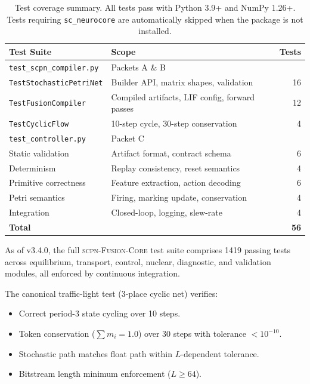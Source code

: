 \documentclass[12pt]{article}
\newcommand{\code}[1]{\texttt{#1}}
\newcommand{\scpn}{\textsc{scpn-Fusion-Core}}
\begin{document}
\begin{table}[htbp]
\centering
\caption{Test coverage summary.  All tests pass with Python 3.9+ and
NumPy 1.26+.  Tests requiring \code{sc\_neurocore} are automatically
skipped when the package is not installed.}
\label{tab:test-coverage}
\begin{tabular}{llr}
\toprule
Test Suite & Scope & Tests \\
\midrule
\code{test\_scpn\_compiler.py} & Packets A \& B &  \\
\quad \code{TestStochasticPetriNet} & Builder API, matrix shapes, validation & 16 \\
\quad \code{TestFusionCompiler} & Compiled artifacts, LIF config, forward passes & 12 \\
\quad \code{TestCyclicFlow} & 10-step cycle, 30-step conservation & 4 \\
\midrule
\code{test\_controller.py} & Packet C &  \\
\quad Static validation & Artifact format, contract schema & 6 \\
\quad Determinism & Replay consistency, reset semantics & 4 \\
\quad Primitive correctness & Feature extraction, action decoding & 6 \\
\quad Petri semantics & Firing, marking update, conservation & 4 \\
\quad Integration & Closed-loop, logging, slew-rate & 4 \\
\midrule
\textbf{Total} & & \textbf{56} \\
\bottomrule
\end{tabular}
\end{table}

As of v3.4.0, the full \scpn{} test suite comprises 1419 passing tests
across equilibrium, transport, control, nuclear, diagnostic, and
validation modules, all enforced by continuous integration.

The canonical traffic-light test (3-place cyclic net) verifies:
\begin{itemize}
  \item Correct period-3 state cycling over 10 steps.
  \item Token conservation ($\sum m_i = 1.0$) over 30 steps with
    tolerance $< 10^{-10}$.
  \item Stochastic path matches float path within $L$-dependent
    tolerance.
  \item Bitstream length minimum enforcement ($L \ge 64$).
\end{itemize}
\end{document}
